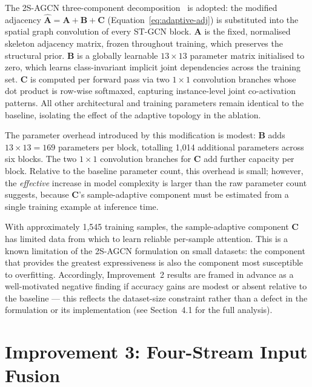 The 2S-AGCN three-component decomposition~\cite{shi2019two} is adopted: the modified adjacency $\hat{\mathbf{A}} = \mathbf{A} + \mathbf{B} + \mathbf{C}$ (Equation~\ref{eq:adaptive-adj}) is substituted into the spatial graph convolution of every ST-GCN block. $\mathbf{A}$ is the fixed, normalised skeleton adjacency matrix, frozen throughout training, which preserves the structural prior. $\mathbf{B}$ is a globally learnable $13 \times 13$ parameter matrix initialised to zero, which learns class-invariant implicit joint dependencies across the training set. $\mathbf{C}$ is computed per forward pass via two $1 \times 1$ convolution branches whose dot product is row-wise softmaxed, capturing instance-level joint co-activation patterns. All other architectural and training parameters remain identical to the baseline, isolating the effect of the adaptive topology in the ablation.

The parameter overhead introduced by this modification is modest: $\mathbf{B}$ adds $13 \times 13 = 169$ parameters per block, totalling 1{,}014 additional parameters across six blocks. The two $1 \times 1$ convolution branches for $\mathbf{C}$ add further capacity per block. Relative to the baseline parameter count, this overhead is small; however, the \emph{effective} increase in model complexity is larger than the raw parameter count suggests, because $\mathbf{C}$'s sample-adaptive component must be estimated from a single training example at inference time.

With approximately 1{,}545 training samples, the sample-adaptive component $\mathbf{C}$ has limited data from which to learn reliable per-sample attention. This is a known limitation of the 2S-AGCN formulation on small datasets: the component that provides the greatest expressiveness is also the component most susceptible to overfitting. Accordingly, Improvement~2 results are framed in advance as a well-motivated negative finding if accuracy gains are modest or absent relative to the baseline --- this reflects the dataset-size constraint rather than a defect in the formulation or its implementation (see Section~4.1 for the full analysis).

\section{Improvement 3: Four-Stream Input Fusion}
\label{sec:fusion-rationale}


